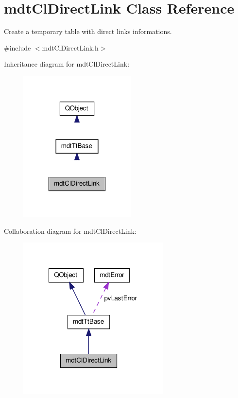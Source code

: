\hypertarget{classmdt_cl_direct_link}{\section{mdt\-Cl\-Direct\-Link Class Reference}
\label{classmdt_cl_direct_link}
}


Create a temporary table with direct links informations.  




{\ttfamily \#include $<$mdt\-Cl\-Direct\-Link.\-h$>$}



Inheritance diagram for mdt\-Cl\-Direct\-Link\-:\nopagebreak
\begin{figure}[H]
\begin{center}
\leavevmode
\includegraphics[width=166pt]{classmdt_cl_direct_link__inherit__graph}
\end{center}
\end{figure}


Collaboration diagram for mdt\-Cl\-Direct\-Link\-:\nopagebreak
\begin{figure}[H]
\begin{center}
\leavevmode
\includegraphics[width=216pt]{classmdt_cl_direct_link__coll__graph}
\end{center}
\end{figure}

